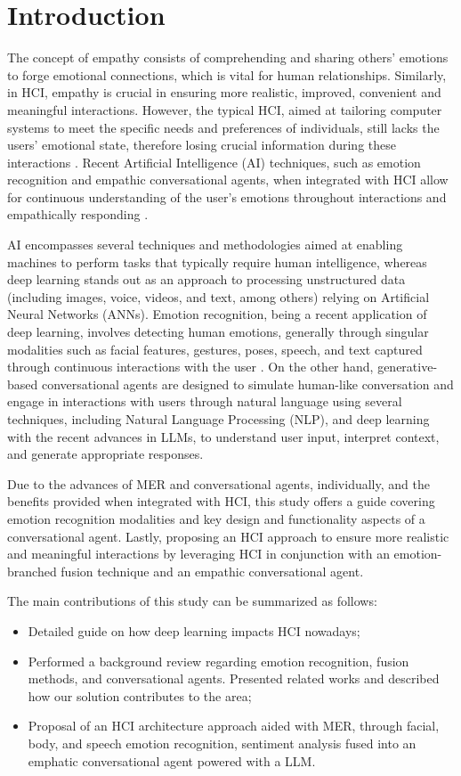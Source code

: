 \documentclass[runningheads]{llncs}
\begin{document}
\section{Introduction}

The concept of empathy consists of comprehending and sharing others' emotions to forge emotional connections, which is vital for human relationships. Similarly, in HCI, empathy is crucial in ensuring more realistic, improved, convenient and meaningful interactions. However, the typical HCI, aimed at tailoring computer systems to meet the specific needs and preferences of individuals, still lacks the users' emotional state, therefore losing crucial information during these interactions \cite{jaiswal_facial_2020}.  Recent Artificial Intelligence (AI) techniques, such as emotion recognition and empathic conversational agents, when integrated with HCI allow for continuous understanding of the user's emotions throughout interactions and empathically responding \cite{santos_approaches_2018}.

AI encompasses several techniques and methodologies aimed at enabling machines to perform tasks that typically require human intelligence, whereas deep learning stands out as an approach to processing unstructured data (including images, voice, videos, and text, among others) relying on Artificial Neural Networks (ANNs). Emotion recognition, being a recent application of deep learning, involves detecting human emotions, generally through singular modalities such as facial features, gestures, poses, speech, and text captured through continuous interactions with the user \cite{alrowais_modified_2023}. On the other hand, generative-based conversational agents are designed to simulate human-like conversation and engage in interactions with users through natural language using several techniques, including Natural Language Processing (NLP), and deep learning with the recent advances in LLMs, to understand user input, interpret context, and generate appropriate responses.

Due to the advances of MER and conversational agents, individually, and the benefits provided when integrated with HCI, this study offers a guide covering emotion recognition modalities and key design and functionality aspects of a conversational agent. Lastly, proposing an HCI approach to ensure more realistic and meaningful interactions by leveraging HCI in conjunction with an emotion-branched fusion technique and an empathic conversational agent.
 
The main contributions of this study can be summarized as follows:
\begin{itemize}
	\item Detailed guide on how deep learning impacts HCI nowadays;
	\item Performed a background review regarding emotion recognition, fusion methods, and conversational agents. Presented related works and described how our solution contributes to the area;
	\item  Proposal of an HCI architecture approach aided with MER, through facial, body, and speech emotion recognition, sentiment analysis fused into an emphatic conversational agent powered with a LLM.
\end{itemize}
\end{document}
